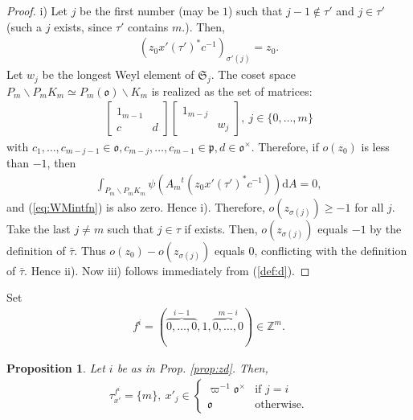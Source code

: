 \documentclass[11pt]{amsart}
\newcommand\s{\sigma}%
\newcommand\Vp{\varpi}%
\newcommand\vp{\varphi}%
\newcommand\oo{\mathfrak{o}}
\newcommand\Sf{{\mathfrak{S}}}
\newcommand\p{{\mathfrak{p}}}
\newcommand\dr{\mathrm{d}}
\newcommand\Z{{\mathbb{Z}}}
\newcommand\1{\mathbf{1}}
\newcommand\nid{\noindent}
\newcommand\bs{\backslash}%
\newcommand\tm{\times}
\numberwithin{equation}{section}
\newtheorem{prop}[thm]{Proposition}
\begin{document}
\begin{proof}
i) Let $j$ be the first number (may be $1$) such that $j -1 \not\in \tau'$ and $j \in \tau'$ (such a $j$ exists, since $\tau'$ contains $m$.).
Then, 
\begin{align*}
(z_0 x'(\tau')^*c^{-1})_{\s'(j)} = z_0.
\end{align*}
Let $w_j$ be the longest Weyl element of $\Sf_j$.
The coset space $P_m \bs P_m K_m \simeq P_m(\oo) \bs K_m$ is realized as the set of matrices: 
\begin{align*}
\begin{bmatrix}
1_{m-1}&  \\
c & d
\end{bmatrix} 
\begin{bmatrix}
1_{m-j}&  \\
& w_j
\end{bmatrix}, \  j \in \{0, \ldots,m \}
\end{align*}
with $c_1, \ldots, c_{m-j-1} \in \oo, c_{m-j}, \ldots, c_{m-1} \in \p, d \in \oo^\tm$.
Therefore, if $o(z_0)$ is less than $-1$, then 
\begin{align*}
\int_{P_m \bs P_m K_m} \psi(A_m {}^t(z_0 x'(\tau')^*c^{-1})) \dr A = 0, 
\end{align*} 
and (\ref{eq:WMintfn}) is also zero.
Hence i).
Therefore, $o(z_{\s(j)}) \ge -1$ for all $j$.
Take the last $j \neq m$ such that $j \in \tau$ if exists.
Then, $o(z_{\s(j)})$ equals $-1$ by the definition of $\bar{\tau}$.
Thus $o(z_{0}) - o(z_{\s(j)})$ equals $0$, conflicting with the definition of $\bar{\tau}$.
Hence ii).
Now iii) follows immediately from (\ref{def:d}).
\end{proof}
\nid
Set 
\begin{align*}
f^i = (\overbrace{0, \ldots, 0}^{i-1}, 1, \overbrace{0, \ldots, 0}^{m-i}) \in \Z^m.
\end{align*} 
\begin{prop}\label{prop:x}
Let $i$ be as in Prop. \ref{prop:zd}.
Then, 
\begin{align*}
\tau_{x'}^{f^i} = \{ m \}, \ 
x'_j \in 
\begin{cases}
\Vp^{-1}\oo^\tm  & \mbox{if $j = i$} \\
\oo & \mbox{otherwise.} 
\end{cases}
\end{align*} 
\end{prop}
\end{document}
